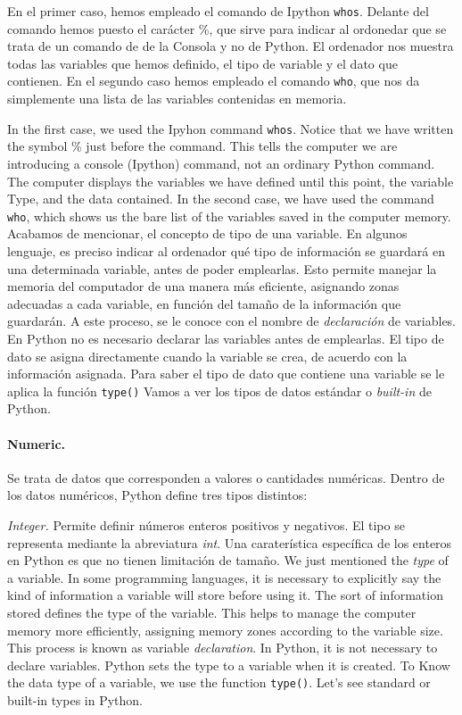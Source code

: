 \begin{paracol}{2}
 En el primer caso, hemos empleado el comando de Ipython \texttt{whos}. Delante del comando hemos puesto el carácter \%, que sirve para indicar al ordonedar que se trata de un comando de de la Consola y no de Python. El ordenador nos muestra todas las variables que hemos definido, el tipo de variable y el dato que contienen. En el segundo caso hemos empleado el comando \texttt{who}, que nos da simplemente una lista de las variables contenidas en memoria. 

 \switchcolumn
 In the first case, we used the Ipyhon command \texttt{whos}. Notice that we have written the symbol \% just before the command. This tells the computer we are introducing a console (Ipython) command, not an ordinary Python command. The computer displays the variables we have defined until this point, the variable Type, and the data contained. In the second case, we have used the command \texttt{who}, which shows us the bare list of the variables saved in the computer memory.
 \switchcolumn Acabamos de mencionar, el concepto de tipo de una variable. En algunos lenguaje, es preciso indicar al ordenador qué tipo de información se guardará en una determinada variable, antes de poder emplearlas. Esto permite manejar la memoria del computador de una manera más eficiente, asignando zonas adecuadas a cada variable, en función del tamaño de la información que guardarán. A este proceso, se le conoce con el nombre de \emph{declaración} de variables. En Python no es necesario declarar las variables antes de emplearlas. El tipo de dato se asigna directamente cuando la variable se crea, de acuerdo con la información asignada. Para saber el tipo de dato que contiene una variable se le aplica la función \texttt{type()} Vamos a ver los tipos de datos estándar o \emph{built-in} de Python.

\paragraph{Numeric.} Se trata de datos que corresponden a valores o cantidades numéricas. Dentro de los datos numéricos, Python define tres tipos distintos:

\emph{Integer.} Permite definir números enteros positivos y negativos. El tipo se representa mediante la abreviatura \emph{int}. Una caraterística específica de los enteros en Python es que no tienen limitación de tamaño.
\switchcolumn
We just mentioned the \emph{type} of a variable. In some programming languages, it is necessary to explicitly say the kind of information a variable will store before using it. The sort of information stored defines the type of the variable. This helps to manage the computer memory more efficiently, assigning memory zones according to the variable size. This process is known as variable \emph{declaration}. In Python, it is not necessary to declare variables. Python sets the type to a variable when it is created. To Know the data type of a variable, we use the function \texttt{type()}. Let's see standard or built-in types in Python.


\end{paracol}
